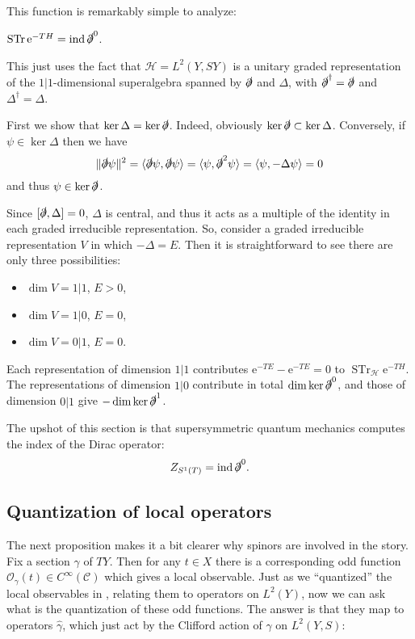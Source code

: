 \documentclass[12pt,letterpaper,reqno]{article}
\numberwithin{equation}{section}
\newcommand{\cC}{\ensuremath{\mathcal C}}
\newcommand{\cO}{\ensuremath{\mathcal O}}
\newcommand{\cH}{\ensuremath{\mathcal H}}
\newcommand{\dirac}{\slashed{\partial}}
\newcommand{\e}{{\mathrm e}}
\newcommand{\norm}[1]{\lVert#1\rVert}
\newcommand{\IP}[1]{\langle#1\rangle}
\DeclareMathOperator{\STr}{STr}
\DeclareMathOperator{\ind}{ind}
\newcommand{\fixme}[1]{{\color{orange}{[#1]}}}
\begin{document}
This function is remarkably simple to analyze:
\begin{prop}
$\STr \e^{-T H} = \ind \dirac^0$.
\end{prop}
\begin{pf}
This just uses the fact that
$\cH = L^2(Y,SY)$ is a unitary graded representation of
the $1|1$-dimensional superalgebra spanned by $\dirac$ and $\Delta$, with $\dirac^\dagger = \dirac$
and $\Delta^\dagger = \Delta$.

First we show that $\ker \Delta = \ker \dirac$.
Indeed, obviously $\ker \dirac \subset \ker \Delta$. Conversely, 
if $\psi \in \ker \Delta$ then we have
\begin{equation}
  \norm{\dirac \psi}^2 = \IP{\dirac \psi, \dirac \psi} = \IP{\psi, \dirac^2 \psi} = \IP{\psi, -\Delta \psi} = 0
\end{equation}
and thus $\psi \in \ker \dirac$.

Since $[\dirac, \Delta] = 0$, $\Delta$ is central, and thus
it acts as a multiple of the identity in each graded irreducible
representation. So, consider a graded irreducible representation
$V$ in which $-\Delta = E$.
Then it is straightforward to see there are only three
possibilities:
\begin{itemize}
  \item $\dim V = 1 \vert 1$, $E > 0$,
  \item $\dim V = 1 \vert 0$, $E = 0$,
  \item $\dim V = 0 \vert 1$, $E = 0$.
\end{itemize}
Each representation of dimension $1 \vert 1$ contributes
$\e^{-TE} - \e^{-TE} = 0$ to $\STr_\cH \e^{-TH}$.
The representations of dimension $1 \vert 0$ contribute
in total $\dim \ker \dirac^0$, and those of dimension $0 \vert 1$
give $- \dim \ker \dirac^1$.
\end{pf}

The upshot of this section is that supersymmetric quantum mechanics
computes the index of the Dirac operator:
\begin{equation}
  Z_{S^1(T)} = \ind \dirac^0.
\end{equation}


\subsection{Quantization of local operators}

The next proposition makes it a bit clearer why spinors are
involved in the story. Fix a section $\gamma$ of $TY$. Then
for any $t \in X$ there is a corresponding odd 
function $\cO_\gamma(t) \in C^\infty(\cC)$
which gives a local observable. Just as we ``quantized''
the local observables in \fixme{...}, relating them to
operators on $L^2(Y)$, now we can ask what is the
quantization of these odd functions.
The answer is that they map to operators 
$\hat\gamma$, which just act by the 
Clifford action of $\gamma$ on $L^2(Y, S)$:
\end{document}

